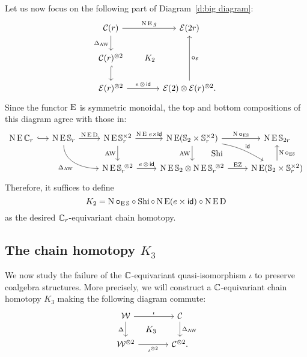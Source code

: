 Let us now focus on the following part of Diagram~\eqref{d:big diagram}:
\[
\begin{tikzcd}
	\cC(r)
	\arrow[r,"\chains\EE g"]
	\arrow[d,"\Delta_{\AW}"']
	\arrow[ddr,phantom,"K_2",shift left=0pt]
	&[15pt] \BE(2r)
	\\
	\cC(r)^{\ot 2}
	\arrow[d,hook] & \\
	\BE(r)^{\ot 2}
	\arrow[r,"e\, \ot\, \id"]
	& \BE(2) \ot \BE(r)^{\ot 2}.
	\arrow[uu,"\bcirc_\BE"']
\end{tikzcd}
\]
Since the functor $\operatorname{E}$ is symmetric monoidal, the top and bottom compositions of this diagram agree with those in:
\[
\begin{tikzcd}
	\chains\EE\cyc_r
	\rar[hook]
	&[-10pt]
	\chains\EE\sym_r
	\rar["\chains\EE\rD"]
	\arrow[dr,in=180,out=-90,"\Delta_{\AW}"'] &
	\chains\EE\sym_r^{\times 2}
	\rar["\chains\EE \, e \times \id"]
	\dar["\AW"'] &[0pt]
	\chains\EE(\sym_2 \times \sym_r^{\times 2})
	\rar["\chains\bcirc_{\EE\!\sym}"]
	\dar["\AW"']
	\drar["\id",out=-10,in=150] &
	\chains\EE\sym_{2r} \\ & &
	\chains\EE\sym_r^{\ \ot 2}
	\rar["e \,\ot\, \id"] &
	\chains\EE\sym_2 \ot \chains\EE\sym_r^{\ \ot 2}
	\rar["\EZ"]
	\uar["\Shi",phantom,shift right=30pt] &
	\chains\EE(\sym_2 \times \sym_r^{\times 2})
	\uar["\chains\bcirc_{\EE\!\sym}"']
\end{tikzcd}
\]
Therefore, it suffices to define
\[
K_2 = \operatorname{N}\bm{\circ}_{\operatorname{E}\mathbb{S}} \circ \operatorname{Shi} \circ \operatorname{N}\operatorname{E}(e \times \mathsf{id}) \circ \operatorname{N}\operatorname{E}\mathrm{D}
\]
as the desired $\mathbb{C}_r$-equivariant chain homotopy.

\subsection{The chain homotopy $K_3$}\label{ss:coproduct}

We now study the failure of the $\mathbb{C}$-equivariant quasi-isomorphism $\iota$ to preserve coalgebra structures.
More precisely, we will construct a $\mathbb{C}$-equivariant chain homotopy $K_3$ making the following diagram commute:
\begin{equation}\label{d:coproducts}
	\begin{tikzcd}[column sep=large]
			\cW \arrow[r,"\iota"] \arrow[d,"\Delta"'] \arrow[dr,phantom,"K_3"]&
			\cC \arrow[d,"\Delta_{\AW}"] \\
			\cW^{\ot 2} \arrow[r,"\iota^{\ot 2}"'] &
			\cC^{\ot 2}.
		\end{tikzcd}
\end{equation}

